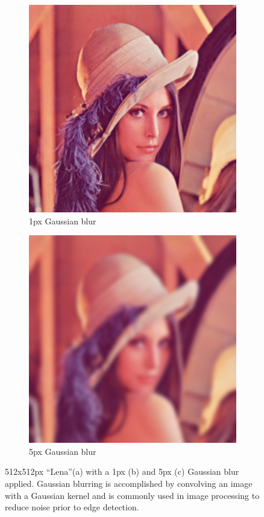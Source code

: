 \begin{figure}[ht]
\begin{subfigure}[b]{0.3\textwidth}
                \includegraphics[scale=0.25]{diagrams/Lenna-blur1}
                \caption{1px Gaussian blur}
       \end{subfigure}
       \begin{subfigure}[b]{0.3\textwidth}
                \includegraphics[scale=0.25]{diagrams/Lenna-blur5}
                \caption{5px Gaussian blur}
       \end{subfigure}
       \caption[Gaussian Blurring] {
       	512x512px ``Lena''(a) with a 1px (b) and 5px (c) Gaussian blur applied. 
		Gaussian blurring is accomplished by convolving an image with a Gaussian kernel 
		and is commonly used in image processing to reduce noise prior to edge detection.
	\label{fig:LenaBlur}}
\end{figure}


